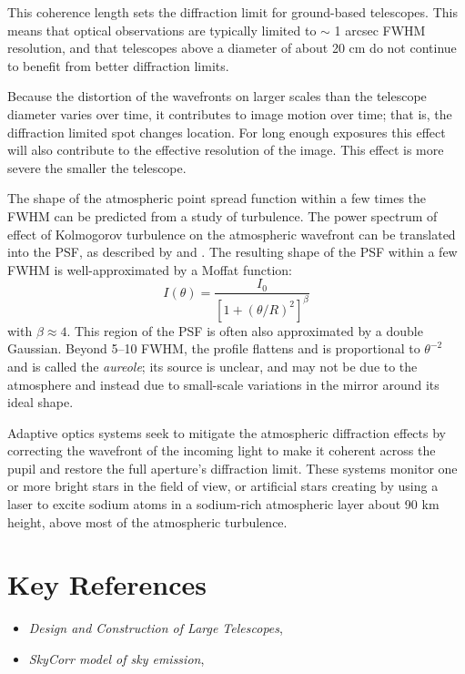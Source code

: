 This coherence length sets the diffraction limit for ground-based
telescopes. This means that optical observations are typically limited
to $\sim$ 1 arcsec FWHM resolution, and that telescopes above a
diameter of about 20 cm do not continue to benefit from better
diffraction limits.

Because the distortion of the wavefronts on larger scales than the
telescope diameter varies over time, it contributes to image motion
over time; that is, the diffraction limited spot changes location. For
long enough exposures this effect will also contribute to the
effective resolution of the image. This effect is more severe the
smaller the telescope.

The shape of the atmospheric point spread function within a few times
the FWHM can be predicted from a study of turbulence. The power
spectrum of effect of Kolmogorov turbulence on the atmospheric
wavefront can be translated into the PSF, as described
by \citet{fried66a} and \citet{johnson73a}. The resulting shape of the
PSF within a few FWHM is well-approximated by a Moffat function:
\begin{equation}
I(\theta) = \frac{I_0}{\left[1 + \left(\theta /
R\right)^2\right]^\beta}
\end{equation}
with $\beta \approx 4$. This region of the PSF is often also
approximated by a double Gaussian. Beyond 5--10 FWHM, the profile
flattens and is proportional to $\theta^{-2}$ and is called the {\it
aureole}; its source is unclear, and may not be due to the atmosphere
and instead due to small-scale variations in the mirror around its
ideal shape.

Adaptive optics systems seek to mitigate the atmospheric diffraction
effects by correcting the wavefront of the incoming light to make it
coherent across the pupil and restore the full aperture's diffraction
limit. These systems monitor one or more bright stars in the field of
view, or artificial stars creating by using a laser to excite sodium
atoms in a sodium-rich atmospheric layer about 90 km height, above
most of the atmospheric turbulence. 

\section{Key References}

\begin{itemize}
  \item {\it Design and Construction of Large Telescopes},
      \citet{bely03a}
  \item {\it SkyCorr model of sky emission}, \citet{noll14a}
\end{itemize}

